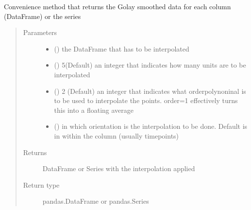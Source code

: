 \documentclass[letterpaper,10pt,english]{sphinxmanual}
\begin{document}
\begin{fulllineitems}
\label{\detokenize{plot_func:plot_func.Frame_golay}}
Convenience method that returns the Golay smoothed data for each column (DataFrame) or the series
\begin{quote}\begin{description}
\item[{Parameters}] \leavevmode\begin{itemize}
\item {} 
 (\sphinxstyleliteralemphasis{\sphinxupquote{,}}) \textendash{} the DataFrame that has to be interpolated

\item {} 
 (\sphinxstyleliteralemphasis{\sphinxupquote{,}}) \textendash{} 5(Default) an integer that indicates how many units are to be interpolated

\item {} 
 (\sphinxstyleliteralemphasis{\sphinxupquote{, }}) \textendash{} 2 (Default) an integer that indicates what orderpolynoninal is to be used to interpolate the points.
order=1 effectively turns this into a floating average

\item {} 
 (\sphinxstyleliteralemphasis{\sphinxupquote{,}}) \textendash{} in which orientation is the interpolation to be done. Default is in within the column (usually timepoints)

\end{itemize}

\item[{Returns}] \leavevmode
DataFrame or Series with the interpolation applied

\item[{Return type}] \leavevmode
pandas.DataFrame or pandas.Series

\end{description}\end{quote}

\end{fulllineitems}
\end{document}
